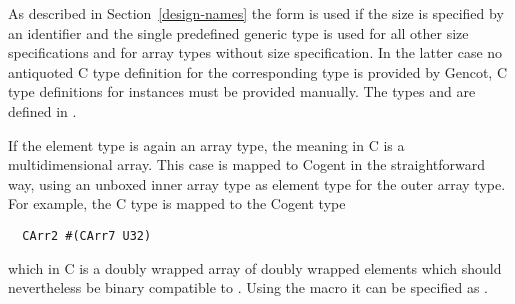 As described in Section~\ref{design-names} the form 
is used if the size is specified by an identifier and the single predefined generic type  is used for all other
size specifications and for array types without size specification. In the latter case no antiquoted C type definition
for the corresponding type  is provided by Gencot, C type definitions for instances must be provided 
manually. The types  and  are defined in .

If the element type  is again an array type, the meaning in C is a multidimensional array.
This case is mapped to Cogent in the straightforward way, using an unboxed inner array type as element type
for the outer array type. For example, the C type  is mapped to the Cogent type
\begin{verbatim}
  CArr2 #(CArr7 U32)
\end{verbatim}
which in C is a doubly wrapped array of doubly wrapped elements which should nevertheless be binary compatible 
to . Using the macro  it can be specified as .

